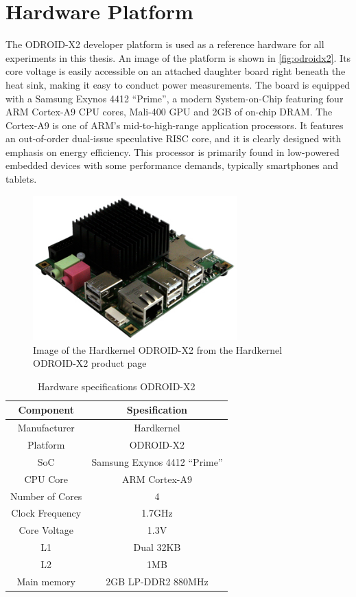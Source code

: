 \section{Hardware Platform}

The ODROID-X2 developer platform \cite{hardkernelodroidx2} is used as a
reference hardware for all experiments in this thesis. An image of the platform
is shown in \autoref{fig:odroidx2}. Its core voltage is easily accessible on an
attached daughter board right beneath the heat sink, making it easy to conduct
power measurements. The board is equipped with a Samsung Exynos 4412 ``Prime'',
a modern System-on-Chip featuring four ARM Cortex-A9 CPU cores, Mali-400 GPU and
2GB of on-chip DRAM. The Cortex-A9 is one of ARM's mid-to-high-range application
processors. It features an out-of-order dual-issue speculative RISC core, and it
is clearly designed with emphasis on energy efficiency. This processor is
primarily found in low-powered embedded devices with some performance demands,
typically smartphones and tablets.

\begin{figure}[bth]
    \centering
    \includegraphics[width=0.7\textwidth]{figs/odroid.jpg}
    \caption{Image of the Hardkernel ODROID-X2 from the Hardkernel ODROID-X2 product page \cite{hardkernelodroidx2}}
    \label{fig:odroidx2}
\end{figure}

\begin{table}
    \centering
    \begin{tabular}{|c|c|}
        \hline
        Component      & Spesification\\
        \hline
        Manufacturer   & Hardkernel \\
        Platform       & ODROID-X2 \\
        SoC            & Samsung Exynos 4412 ``Prime'' \\
        CPU Core       & ARM Cortex-A9 \\
        Number of Cores& 4 \\
        Clock Frequency& 1.7GHz \\
        Core Voltage   & 1.3V \\
        L1             & Dual 32KB \\
        L2             & 1MB \\
        Main memory    & 2GB LP-DDR2 880MHz \\
        \hline
    \end{tabular}
    \caption{Hardware specifications ODROID-X2}
    \label{tab:hwspecx2}
\end{table}

